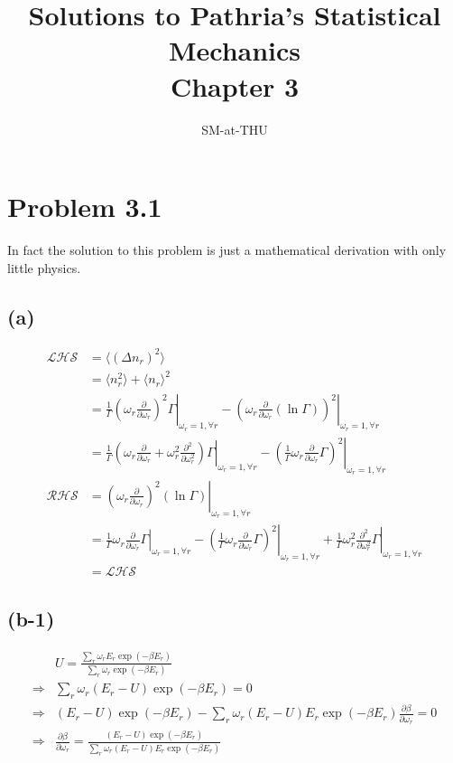\documentclass{article}
\author{SM-at-THU}
\title{\bf{Solutions to Pathria's Statistical Mechanics}\\Chapter 3}
\begin{document}
\maketitle

\section*{Problem 3.1}
In fact the solution to this problem is just a mathematical derivation with only little physics.
\subsection*{(a)}
    \begin{align}
    \mathcal{LHS}&=\langle \left( \Delta n_r \right)^2 \rangle\\
    &=\langle n_r^2 \rangle +\langle n_r \rangle^2\\
    &=\left. \frac{1}{\Gamma}\left( \omega_r \frac{\partial}{\partial \omega_r } \right)^2\Gamma \right|_{\omega_r=1,\forall r}
    - \left. \left(   \omega_r \frac{\partial}{\partial \omega_r }  \left(\ln \Gamma \right)  \right)^2 \right|_{\omega_r=1,\forall r}\\
    &= \left. \frac{1}{\Gamma} \left( \omega_r \frac{\partial}{\partial \omega_r } + \omega_r^2 \frac{\partial^2}{\partial \omega_r^2} \right)\Gamma \right|_{\omega_r=1,\forall r}
    - \left. \left( \frac{1}{\Gamma}   \omega_r \frac{\partial}{\partial \omega_r } \Gamma \right)^2 \right|_{\omega_r=1,\forall r}\\
    \mathcal{RHS}&=\left. \left( \omega_r \frac{\partial}{\partial \omega_r } \right)^2\left(\ln \Gamma \right)  \right|_{\omega_r=1,\forall r}\\
    &= \left. \frac{1}{\Gamma}  \omega_r \frac{\partial}{\partial \omega_r }\Gamma \right|_{\omega_r=1,\forall r}
    - \left. \left( \frac{1}{\Gamma}   \omega_r \frac{\partial}{\partial \omega_r } \Gamma \right)^2 \right|_{\omega_r=1,\forall r}
    +\left. \frac{1}{\Gamma}\omega_r^2 \frac{\partial^2}{\partial \omega_r^2} \Gamma \right|_{\omega_r=1,\forall r}\\
    &=\mathcal{LHS}
    \end{align}
\subsection*{(b-1)}
    \begin{align}
    & U=\frac{\sum_r\omega_r E_r \exp{(-\beta E_r)}}{\sum_r\omega_r \exp{(-\beta E_r)}}\\
    \Rightarrow& \sum_r\omega_r (E_r-U) \exp{(-\beta E_r)}=0\\
    \Rightarrow& (E_r-U)\exp{(-\beta E_r)}-\sum_r\omega_r (E_r-U) E_r \exp{(-\beta E_r)} \frac{\partial\beta}{\partial\omega_r}=0\\
    \Rightarrow& \frac{\partial\beta}{\partial\omega_r}= \frac{(E_r-U)\exp{(-\beta E_r)}} {\sum_r\omega_r (E_r-U) E_r \exp{(-\beta E_r)}}
    \end{align}
\end{document}
